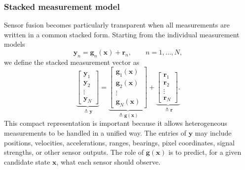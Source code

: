 \documentclass{ieeeaccess}
\begin{document}
\subsubsection{Stacked measurement model}
Sensor fusion becomes particularly transparent when all measurements are written in a common stacked form. Starting from the individual measurement models
\begin{equation}
\mathbf{y}_n
=
\mathbf{g}_n(\mathbf{x})
+
\mathbf{r}_n,
\qquad n=1,\ldots,N,
\end{equation}
we define the stacked measurement vector as
\begin{equation}
\underbrace{\begin{bmatrix}
\mathbf{y}_1\\
\mathbf{y}_2\\
\vdots\\
\mathbf{y}_N
\end{bmatrix}}_{\triangleq \mathbf{y}} = 
\underbrace{\begin{bmatrix}
\mathbf{g}_1(\mathbf{x})\\
\mathbf{g}_2(\mathbf{x})\\
\vdots\\
\mathbf{g}_N(\mathbf{x})
\end{bmatrix}}_{\triangleq \mathbf{g}(\mathbf{x})} + 
\underbrace{\begin{bmatrix}
\mathbf{r}_1\\
\mathbf{r}_2\\
\vdots\\
\mathbf{r}_N
\end{bmatrix}.}_{\triangleq \mathbf{r}}
\end{equation}
This compact representation is important because it allows heterogeneous measurements to be handled in a unified way. The entries of $\mathbf{y}$ may include positions, velocities, accelerations, ranges, bearings, pixel coordinates, signal strengths, or other sensor outputs. The role of $\mathbf{g}(\mathbf{x})$ is to predict, for a given candidate state $\mathbf{x}$, what each sensor should observe.
\end{document}
